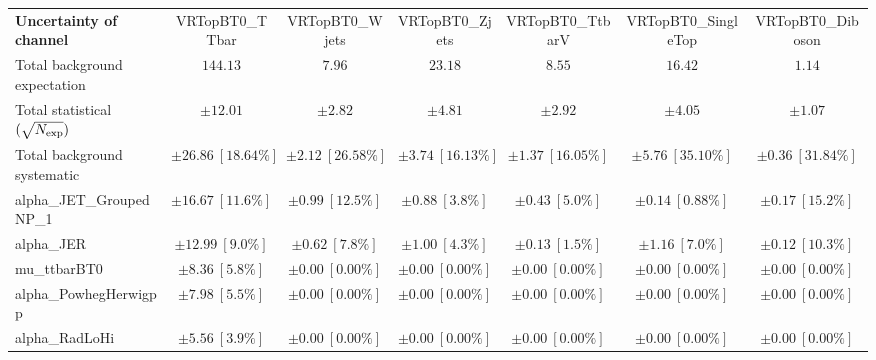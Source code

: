 
\begin{sidewaystable}
\begin{center}
\setlength{\tabcolsep}{0.0pc}
\begin{tabular*}{\textwidth}{@{\extracolsep{\fill}}lcccccc}
\noalign{\smallskip}\hline\noalign{\smallskip}
{\bf Uncertainty of channel}                                    & VRTopBT0\_TTbar            & VRTopBT0\_Wjets            & VRTopBT0\_Zjets            & VRTopBT0\_TtbarV            & VRTopBT0\_SingleTop            & VRTopBT0\_Diboson            \\
\noalign{\smallskip}\hline\noalign{\smallskip}
Total background expectation             &  $144.13$        &  $7.96$        &  $23.18$        &  $8.55$        &  $16.42$        &  $1.14$       \\
\noalign{\smallskip}\hline\noalign{\smallskip}
Total statistical $(\sqrt{N_{\rm exp}})$              & $\pm 12.01$        & $\pm 2.82$        & $\pm 4.81$        & $\pm 2.92$        & $\pm 4.05$        & $\pm 1.07$       \\
Total background systematic               & $\pm 26.86\ [18.64\%] $        & $\pm 2.12\ [26.58\%] $        & $\pm 3.74\ [16.13\%] $        & $\pm 1.37\ [16.05\%] $        & $\pm 5.76\ [35.10\%] $        & $\pm 0.36\ [31.84\%] $             \\
\noalign{\smallskip}\hline\noalign{\smallskip}
\noalign{\smallskip}\hline\noalign{\smallskip}
alpha\_JET\_GroupedNP\_1         & $\pm 16.67\ [11.6\%] $          & $\pm 0.99\ [12.5\%] $          & $\pm 0.88\ [3.8\%] $          & $\pm 0.43\ [5.0\%] $          & $\pm 0.14\ [0.88\%] $          & $\pm 0.17\ [15.2\%] $       \\
alpha\_JER         & $\pm 12.99\ [9.0\%] $          & $\pm 0.62\ [7.8\%] $          & $\pm 1.00\ [4.3\%] $          & $\pm 0.13\ [1.5\%] $          & $\pm 1.16\ [7.0\%] $          & $\pm 0.12\ [10.3\%] $       \\
mu\_ttbarBT0         & $\pm 8.36\ [5.8\%] $          & $\pm 0.00\ [0.00\%] $          & $\pm 0.00\ [0.00\%] $          & $\pm 0.00\ [0.00\%] $          & $\pm 0.00\ [0.00\%] $          & $\pm 0.00\ [0.00\%] $       \\
alpha\_PowhegHerwigpp         & $\pm 7.98\ [5.5\%] $          & $\pm 0.00\ [0.00\%] $          & $\pm 0.00\ [0.00\%] $          & $\pm 0.00\ [0.00\%] $          & $\pm 0.00\ [0.00\%] $          & $\pm 0.00\ [0.00\%] $       \\
alpha\_RadLoHi         & $\pm 5.56\ [3.9\%] $          & $\pm 0.00\ [0.00\%] $          & $\pm 0.00\ [0.00\%] $          & $\pm 0.00\ [0.00\%] $          & $\pm 0.00\ [0.00\%] $          & $\pm 0.00\ [0.00\%] $       \\

\end{tabular*}
\end{center}
\end{sidewaystable}
